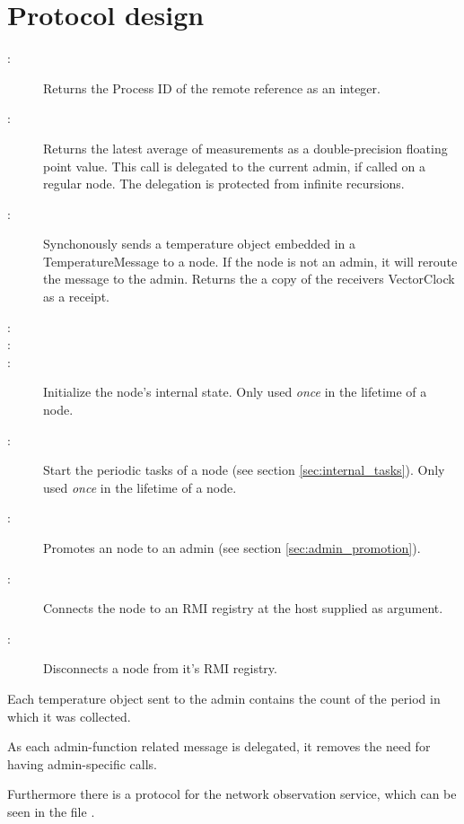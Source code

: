 \documentclass[10pt,a4paper]{article}
\begin{document}
\section{Protocol design}
\begin{description}
  \item[:] Returns the Process ID of the remote reference as an integer.
  \item[:] Returns the latest average of measurements as a double-precision floating point value. This call is delegated to the current admin, if called on a regular node. The delegation is protected from infinite recursions.
  \item[:] Synchonously sends a temperature object embedded in a TemperatureMessage to a node. If the node is not an admin, it will reroute the message to the admin. Returns the a copy of the receivers VectorClock as a receipt.
  \item[:] %
  \item[:] %
  \item[:] Initialize the node's internal state. Only used \emph{once} in the lifetime of a node.
  \item[:] Start the periodic tasks of a node (see section \ref{sec:internal_tasks}). Only used \emph{once} in the lifetime of a node.
  \item[:] Promotes an node to an admin (see section \ref{sec:admin_promotion}).
  \item[:] Connects the node to an RMI registry at the host supplied as argument.
  \item[:] Disconnects a node from it's RMI registry.
\end{description} 

Each temperature object sent to the admin contains the count of the period in which it was collected.

As each admin-function related message is delegated, it removes the need for having admin-specific calls.

Furthermore there is a protocol for the network observation service, which can be seen in the file .
\end{document}
